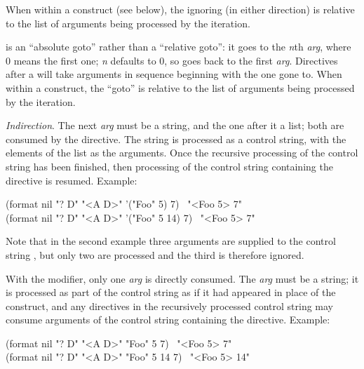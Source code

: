 \begin{flushdesc}
When within a \cd{{\Xtilde}{\Xlbrace}} construct
(see below), the ignoring (in either direction) is relative to the list
of arguments being processed by the iteration.

 is an ``absolute goto'' rather than a ``relative goto'':
it goes to the {\it n}th {\it arg}, where 0 means the first one;
{\it n} defaults to 0, so \cd{{\Xtilde}{\Xatsign}*} goes back to the first {\it arg}.
Directives after a 
will take arguments in sequence beginning with the one gone to.
When within a \cd{{\Xtilde}{\Xlbrace}} construct, the ``goto''
is relative to the list of arguments being processed by the iteration.

\item[\cd{{\Xtilde}?}]
{\it Indirection}.
The next {\it arg} must be a string, and the one after it a list;
both are consumed by the  directive.
The string is processed as a  control string, with the
elements of the list as the arguments.  Once the recursive processing
of the control string has been finished, then processing of the control
string containing the  directive is resumed.
Example:
\begin{lisp}
(format nil "{\Xtilde}? {\Xtilde}D" "<{\Xtilde}A {\Xtilde}D>" '("Foo" 5) 7) \EV\ "<Foo 5> 7" \\
(format nil "{\Xtilde}? {\Xtilde}D" "<{\Xtilde}A {\Xtilde}D>" '("Foo" 5 14) 7) \EV\ "<Foo 5> 7"
\end{lisp}
Note that in the second example three arguments are supplied
to the control string , but only two are processed
and the third is therefore ignored.

With the \cd{{\Xatsign}} modifier, only one {\it arg} is directly consumed.
The {\it arg} must be a string; it is processed as part of the control
string as if it had appeared in place of the  construct,
and any directives in the recursively processed control string may
consume arguments of the control string containing the 
directive.
Example:
\begin{lisp}
(format nil "{\Xtilde}{\Xatsign}? {\Xtilde}D" "<{\Xtilde}A {\Xtilde}D>" "Foo" 5 7) \EV\ "<Foo 5> 7" \\
(format nil "{\Xtilde}{\Xatsign}? {\Xtilde}D" "<{\Xtilde}A {\Xtilde}D>" "Foo" 5 14 7) \EV\ "<Foo 5> 14"
\end{lisp}


\end{flushdesc}
